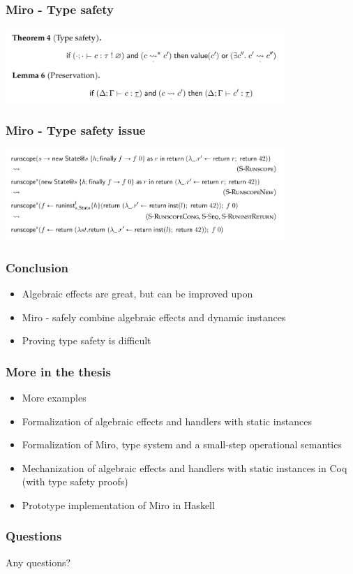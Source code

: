 \documentclass{beamer}
\begin{document}
\begin{frame}[fragile]\frametitle{Miro - Type safety}
\begin{center}
\includegraphics[width=300pt]{images/type-safety.png}
\end{center}
\end{frame}

\begin{frame}[fragile]\frametitle{Miro - Type safety issue}
\begin{center}
\includegraphics[width=300pt]{images/counter-example.png}
\end{center}
\end{frame}

\begin{frame}[fragile]\frametitle{Conclusion}
\begin{itemize}
\item Algebraic effects are great, but can be improved upon
\item Miro - safely combine algebraic effects and dynamic instances
\item Proving type safety is difficult
\end{itemize}
\end{frame}

\begin{frame}[fragile]\frametitle{More in the thesis}
\begin{itemize}
\item More examples
\item Formalization of algebraic effects and handlers with static instances
\item Formalization of Miro, type system and a small-step operational semantics
\item Mechanization of algebraic effects and handlers with static instances in Coq (with type safety proofs)
\item Prototype implementation of Miro in Haskell
\end{itemize}
\end{frame}

\begin{frame}[fragile]\frametitle{Questions}
Any questions?
\end{frame}
\end{document}
